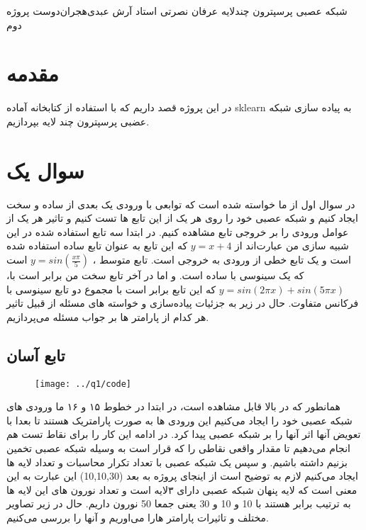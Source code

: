 \documentclass[a4paper,12pt]{article}
\begin{document}
\handout

{شبکه عصبی پرسپترون چندلایه}
{عرفان نصرتی}
{استاد آرش عبدی‌هجران‌دوست}
{}
{پروژه دوم}

\section*{}
\section*{مقدمه}
در این پروژه قصد داریم که با استفاده از کتابخانه آماده sklearn به پیاده سازی شبکه عضبی پرسپترون چند لایه بپردازیم. 
\section{سوال یک}
در سوال اول از ما خواسته شده است که توابعی با ورودی یک بعدی از ساده و سخت ایجاد کنیم و شبکه عصبی خود را روی هر یک از این تابع ها تست کنیم و تاثیر هر یک از عوامل ورودی را بر خروجی تابع مشاهده کنیم. در ابتدا سه تابع استفاده شده در این شبیه سازی من عبارت‌اند از $  y = x+4 $ که این تابع به عنوان تابع ساده استفاده شده است و یک تابع خطی از ورودی به خروجی است. تابع متوسط ، 
$  y = sin(\frac{x\pi}{5}) $
است که یک سینوسی با ساده است. و اما در آخر تابع سخت من برابر است با، $  y= sin(2\pi x) + sin(5\pi x) $ که این تابع برابر است با مجموع دو تابع سینوسی با فرکانس متفاوت.
\newline
حال در زیر به جزئیات پیاده‌سازی و خواسته های‌ مسئله از قبیل تاثیر هر کدام از پارامتر ها بر جواب مسئله می‌پردازیم.
\subsection{تابع آسان}

 \begin{figure}[H]
\texttt{[image: ../q1/code]}
\centering
\end{figure}
همانطور که در بالا قابل مشاهده است، در ابتدا در خطوط ۱۵ و ۱۶ ما ورودی های شبکه عصبی خود را ایجاد می‌کنیم این ورودی ها به صورت پارامتریک هستند تا بعدا با تعویض آنها اثر آنها را بر شبکه عصبی پیدا کرد.
در ادامه این کار را برای نقاط تست هم انجام می‌دهیم تا مقدار واقعی نقاطی را که قرار است به وسیله شبکه عصبی تخمین بزنیم داشته باشیم. و سپس یک شبکه عصبی با تعداد تکرار محاسبات و تعداد لایه ها ایجاد می‌کنیم لازم به توضیح است از اینجای پروژه به بعد (10,10,30) این عبارت به این معنی است که لایه پنهان شبکه عصبی دارای ۳لایه است و تعداد نورون های این لایه ها به ترتیب برابر هستند با 10 و 10 و 30 یعنی جمعا  50 نورون داریم. حال در زیر تصاویر مختلف و تاثیرات پارامتر هارا می‌اوریم و آنها را بررسی می‌کنیم.
\newpage
\end{document}
